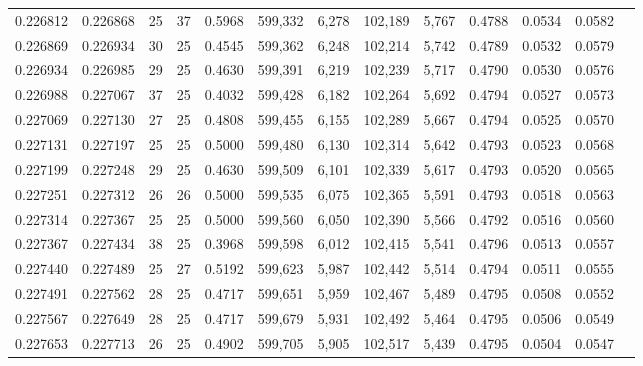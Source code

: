 \begin{tabular}{rrrrrrrrrrrrr}
0.226812 & 0.226868 &  25 &  37 &                                     0.5968 & 599,332 &   6,278 & 102,189 &   5,767 & 0.4788 & 0.0534 & 0.0582 \\
0.226869 & 0.226934 &  30 &  25 &                                     0.4545 & 599,362 &   6,248 & 102,214 &   5,742 & 0.4789 & 0.0532 & 0.0579 \\
0.226934 & 0.226985 &  29 &  25 &                                     0.4630 & 599,391 &   6,219 & 102,239 &   5,717 & 0.4790 & 0.0530 & 0.0576 \\
0.226988 & 0.227067 &  37 &  25 &                                     0.4032 & 599,428 &   6,182 & 102,264 &   5,692 & 0.4794 & 0.0527 & 0.0573 \\
0.227069 & 0.227130 &  27 &  25 &                                     0.4808 & 599,455 &   6,155 & 102,289 &   5,667 & 0.4794 & 0.0525 & 0.0570 \\
0.227131 & 0.227197 &  25 &  25 &                                     0.5000 & 599,480 &   6,130 & 102,314 &   5,642 & 0.4793 & 0.0523 & 0.0568 \\
0.227199 & 0.227248 &  29 &  25 &                                     0.4630 & 599,509 &   6,101 & 102,339 &   5,617 & 0.4793 & 0.0520 & 0.0565 \\
0.227251 & 0.227312 &  26 &  26 &                                     0.5000 & 599,535 &   6,075 & 102,365 &   5,591 & 0.4793 & 0.0518 & 0.0563 \\
0.227314 & 0.227367 &  25 &  25 &                                     0.5000 & 599,560 &   6,050 & 102,390 &   5,566 & 0.4792 & 0.0516 & 0.0560 \\
0.227367 & 0.227434 &  38 &  25 &                                     0.3968 & 599,598 &   6,012 & 102,415 &   5,541 & 0.4796 & 0.0513 & 0.0557 \\
0.227440 & 0.227489 &  25 &  27 &                                     0.5192 & 599,623 &   5,987 & 102,442 &   5,514 & 0.4794 & 0.0511 & 0.0555 \\
0.227491 & 0.227562 &  28 &  25 &                                     0.4717 & 599,651 &   5,959 & 102,467 &   5,489 & 0.4795 & 0.0508 & 0.0552 \\
0.227567 & 0.227649 &  28 &  25 &                                     0.4717 & 599,679 &   5,931 & 102,492 &   5,464 & 0.4795 & 0.0506 & 0.0549 \\
0.227653 & 0.227713 &  26 &  25 &                                     0.4902 & 599,705 &   5,905 & 102,517 &   5,439 & 0.4795 & 0.0504 & 0.0547 \\

\end{tabular}
